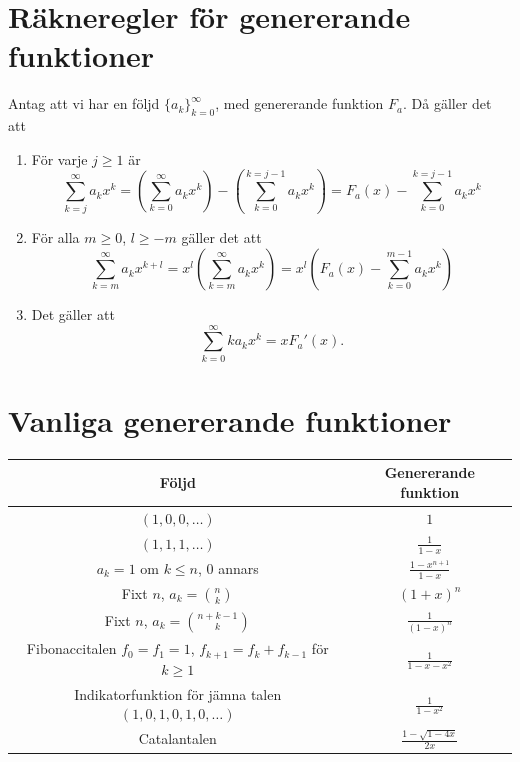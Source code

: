 \documentclass[nobib]{tufte-handout}
\begin{document}
\section{Räkneregler för genererande funktioner}

\begin{lemma}
  Antag att vi har en följd $\{a_k\}_{k=0}^\infty$, med genererande funktion $F_a$. Då gäller det att
    \begin{enumerate}
        \item För varje $j \geq 1$ är
        $$\sum_{k = j}^{\infty} a_k x^k = \left(\sum_{k=0}^{\infty}a_k x^k\right) - \left(\sum_{k=0}^{k=j-1} a_kx^k\right) = F_a(x) - \sum_{k=0}^{k=j-1} a_kx^k$$
        \item För alla $m \geq 0$, $l \geq -m$ gäller det att
        $$\sum_{k=m}^{\infty} a_k x^{k + l} = x^l\left(\sum_{k=m}^{\infty} a_k x^{k}\right) = x^l\left(F_a(x) - \sum_{k=0}^{m-1} a_k x^k\right)$$
        \item Det gäller att
        $$\sum_{k=0}^{\infty} k a_k x^k = x F_a'(x).$$
    \end{enumerate}
\end{lemma}

\section{Vanliga genererande funktioner}

\begin{tabularx}{\linewidth}{cc}
  Följd & Genererande funktion\\
  \midrule
  $(1, 0, 0, \ldots)$ & $1$\\
  $(1,1,1,\ldots)$ & $\frac{1}{1-x}$\\
  $a_k = 1$ om $k \leq n$, $0$ annars & $\frac{1 - x^{n+1}}{1 - x}$\\
  Fixt $n$, $a_k = \binom{n}{k}$ & $(1+x)^n$\\
  Fixt $n$, $a_k = \binom{n+k-1}{k}$ & $\frac{1}{(1-x)^n}$\\
  \specialcell{Fibonaccitalen\\$f_0 = f_1 = 1$, $f_{k+1} = f_k + f_{k-1}$ för $k \geq 1$} & $\frac{1}{1 - x - x^2}$\\
  \specialcell{Indikatorfunktion för jämna talen\\$(1,0,1,0,1,0,\ldots)$} & $\frac{1}{1-x^2}$\\
  Catalantalen & $\frac{1 - \sqrt{1 - 4x}}{2x}$
\end{tabularx}
\end{document}
